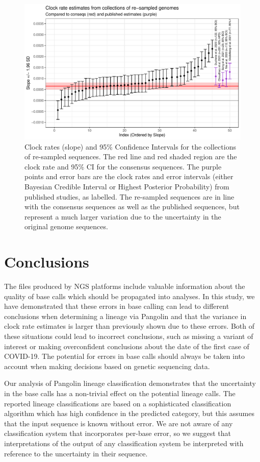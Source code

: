 \documentclass[10pt]{article}
\begin{document}
\begin{figure}
\includegraphics[width=\textwidth]{figs/RTT_Slope.pdf}
\caption{\label{fig:RTT_slope}Clock rates (slope) and 95\% Confidence Intervals for the collections of re-sampled sequences.
The red line and red shaded region are the clock rate and 95\% CI for the consensus sequences.
The purple points and error bars are the clock rates and error intervals (either Bayesian Credible Interval or Highest Posterior Probability) from published studies, as labelled.
The re-sampled sequences are in line with the consensus sequences as well as the published sequences, but represent a much larger variation due to the uncertainty in the original genome sequences.}
\end{figure}


\section{Conclusions}

The files produced by NGS platforms include valuable information about the quality of base calls which should be propagated into analyses.
In this study, we have demonstrated that these errors in base calling can lead to different conclusions when determining a lineage via Pangolin and that the variance in clock rate estimates is larger than previously shown due to these errors.
Both of these situations could lead to incorrect conclusions, such as missing a variant of interest or making overconfident conclusions about the date of the first case of COVID-19.
The potential for errors in base calls should always be taken into account when making decisions based on genetic sequencing data.

Our analysis of Pangolin lineage classification demonstrates that the uncertainty in the base calls has a non-trivial effect on the potential lineage calls.
The reported lineage classifications are based on a sophisticated classification algorithm which has high confidence in the predicted category, but this assumes that the input sequence is known without error.
We are not aware of any classification system that incorporates per-base error, so we suggest that interpretations of the output of any classification system be interpreted with reference to the uncertainty in their sequence.
\end{document}
